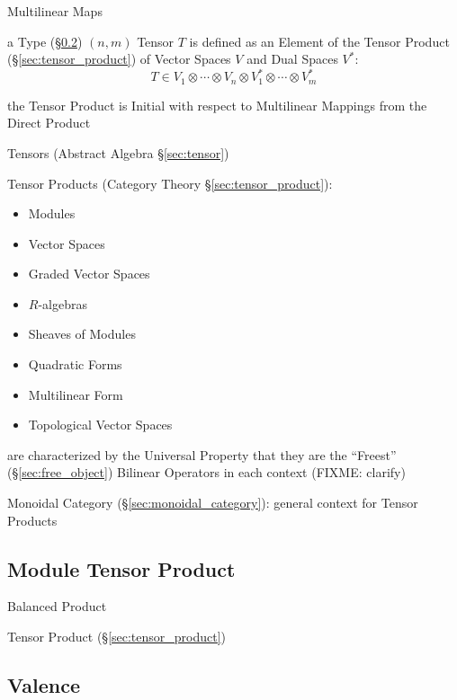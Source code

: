 Multilinear Maps


\asterism


a Type (\S\ref{sec:valence}) $(n,m)$ Tensor $T$ is defined as an
Element of the Tensor Product (\S\ref{sec:tensor_product}) of Vector
Spaces $V$ and Dual Spaces $V^*$:
\[
  T \in V_1 \otimes \cdots \otimes V_n
    \otimes V^*_1 \otimes \cdots \otimes V^*_m
\]

the Tensor Product is Initial with respect to Multilinear Mappings
from the Direct Product

Tensors (Abstract Algebra \S\ref{sec:tensor})

Tensor Products (Category Theory \S\ref{sec:tensor_product}):
\begin{itemize}
  \item Modules
  \item Vector Spaces
  \item Graded Vector Spaces
  \item $R$-algebras
  \item Sheaves of Modules
  \item Quadratic Forms
  \item Multilinear Form
  \item Topological Vector Spaces
\end{itemize}
are characterized by the Universal Property that they are the ``Freest''
(\S\ref{sec:free_object}) Bilinear Operators in each context
(FIXME: clarify)

Monoidal Category (\S\ref{sec:monoidal_category}): general context for
Tensor Products



\subsection{Module Tensor Product}\label{sec:module_tensor_product}

Balanced Product

\fist Tensor Product (\S\ref{sec:tensor_product})



\subsection{Valence}\label{sec:valence}

